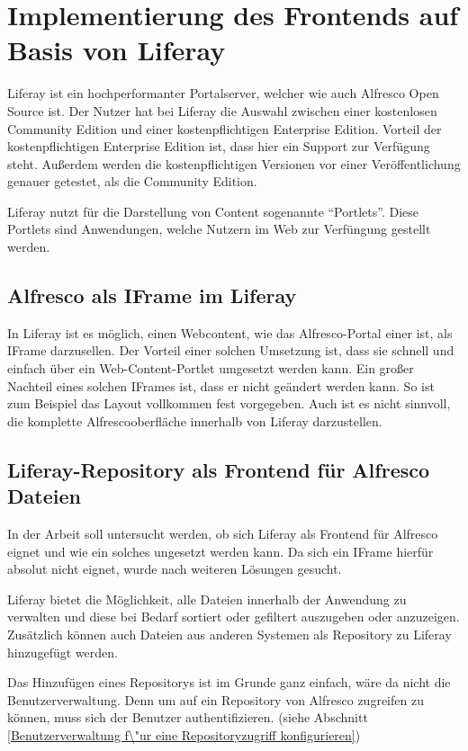 \section{Implementierung des Frontends auf Basis von Liferay} \label{Implementierung Frontend}
Liferay ist ein hochperformanter Portalserver, welcher wie auch Alfresco Open Source ist. Der Nutzer hat bei Liferay die Auswahl zwischen einer kostenlosen Community Edition und einer kostenpflichtigen Enterprise Edition. Vorteil der kostenpflichtigen Enterprise Edition ist, dass hier ein Support zur Verf\"ugung steht. Au\ss{}erdem werden die kostenpflichtigen Versionen vor einer Ver\"offentlichung genauer getestet, als die Community Edition. \cite{Alfresco_und_Liferay} \cite{Wiki_Liferay}

Liferay nutzt f\"ur die Darstellung von Content sogenannte "`Portlets"'. Diese Portlets sind Anwendungen, welche Nutzern im Web zur Verf\"ungung gestellt werden.

\subsection{Alfresco als IFrame im Liferay}
In Liferay ist es m\"oglich, einen Webcontent, wie das Alfresco-Portal einer ist, als IFrame darzusellen. Der Vorteil einer solchen Umsetzung ist, dass sie schnell und einfach \"uber ein Web-Content-Portlet umgesetzt werden kann. Ein gro\ss{}er Nachteil eines solchen IFrames ist, dass er nicht ge\"andert werden kann. So ist zum Beispiel das Layout vollkommen fest vorgegeben. Auch ist es nicht sinnvoll, die komplette Alfrescooberfl\"ache innerhalb von Liferay darzustellen.

\subsection{Liferay-Repository als Frontend f\"ur Alfresco Dateien}
In der Arbeit soll untersucht werden, ob sich Liferay als Frontend f\"ur Alfresco eignet und wie ein solches ungesetzt werden kann. Da sich ein IFrame hierf\"ur absolut nicht eignet, wurde nach weiteren L\"osungen gesucht.

Liferay bietet die M\"oglichkeit, alle Dateien innerhalb der Anwendung zu verwalten und diese bei Bedarf sortiert oder gefiltert auszugeben oder anzuzeigen. Zus\"atzlich k\"onnen auch Dateien aus anderen Systemen als Repository zu Liferay hinzugef\"ugt werden. 

Das Hinzuf\"ugen eines Repositorys ist im Grunde ganz einfach, w\"are da nicht die Benutzerverwaltung. Denn um auf ein Repository von Alfresco zugreifen zu k\"onnen, muss sich der Benutzer authentifizieren. (siehe Abschnitt \ref{Benutzerverwaltung f\"ur eine Repositoryzugriff konfigurieren})

